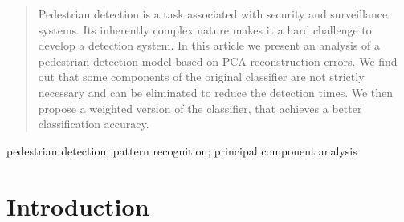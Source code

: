 \documentclass[10pt, conference, compsocconf]{IEEEtran}
\begin{document}





\maketitle


\begin{abstract}
Pedestrian detection is a task associated with security and surveillance systems. Its inherently complex nature makes it a hard challenge to develop a detection system. In this article we present an analysis of a pedestrian detection model based on PCA reconstruction errors. We find out that some components of the original classifier are not strictly necessary and can be eliminated to reduce the detection times. We then propose a weighted version of the classifier, that achieves a better classification accuracy.
\end{abstract}

\begin{IEEEkeywords}
pedestrian detection; pattern recognition; principal component analysis
\end{IEEEkeywords}


%
\IEEEpeerreviewmaketitle



\section{Introduction}
\end{document}
